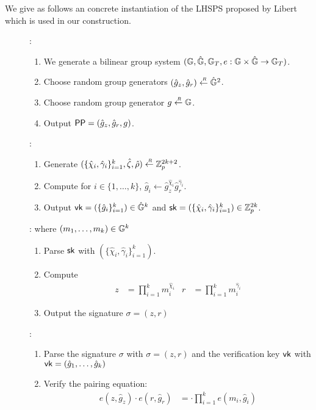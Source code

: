 
\label{LHSPS}
We give as follows an concrete instantiation of the LHSPS proposed by Libert \etal~\cite{DBLP:conf/crypto/LibertPJY13} which is used in our construction.
  
\begin{description}
\item[]:
  \begin{enumerate}
  \item We generate a bilinear group system $(\mathbb{G}, \hat{\mathbb{G}}, \mathbb{G}_T, e:\mathbb{G} \times \hat{\mathbb{G}} \to \mathbb{G}_T)$.
  \item Choose random group generators $(\hat{g}_z, \hat{g}_r) \stackrel{{\scriptscriptstyle \mkern4mu R}}{\gets} \hat{\mathbb{G}}^2$.
  \item Choose random group generator $g \stackrel{{\scriptscriptstyle \mkern4mu R}}{\gets} \mathbb{G}$.
  \item Output $\mathsf{PP} = (\hat{g}_z, \hat{g}_r, g)$.
  \end{enumerate}
\item[]:
  \begin{enumerate}
  \item Generate $(\{\hat{\chi}_i, \hat{\gamma}_i\}_{i =1 }^k, \hat{\zeta}, \hat{\rho}) \stackrel{{\scriptscriptstyle \mkern4mu R}}{\gets} \mathbb{Z}_p^{2k+2}$.
  \item Compute for $i \in \{1, \dots, k\}$, $\hat{g}_i \gets \hat{g}_z^{\hat{\chi}_i}\hat{g}_r^{\hat{\gamma}_i}$.
  \item Output $\mathsf{vk} = (\{\hat{g}_i\}_{i=1}^k) \in \hat{\mathbb{G}}^{k}$ and $\mathsf{sk} = (\{\hat{\chi}_i, \hat{\gamma}_i\}_{i=1}^k) \in \mathbb{Z}_p^{2k}$.
  \end{enumerate}
\item[]: where $(m_1, \dots, m_k) \in \mathbb{G}^k$
  \begin{enumerate}
  \item Parse $\mathsf{sk}$ with $(\{\hat{\chi}_i, \hat{\gamma}_i\}_{i = 1}^k)$.
  \item Compute
    \begin{align*}
      z &= \prod_{i=1}^km_i^{\hat{\chi}_i} & r &= \prod_{i =1}^km_i^{\hat{\gamma}_i} 
    \end{align*}
  \item Output the signature $\sigma = (z, r)$
  \end{enumerate}

\item[]:
  \begin{enumerate}
  \item Parse the signature $\sigma$ with $\sigma = (z, r)$ and the verification key $\mathsf{vk}$ with $\mathsf{vk} = (\hat{g}_1, \dots, \hat{g}_k)$
  \item Verify the pairing equation:
    \begin{align*}
      e(z, \hat{g}_z) \cdot e(r, \hat{g}_r) &=  \cdot \prod_{i = 1}^ke(m_i, \hat{g}_i)
    \end{align*}
  \end{enumerate}
\end{description}
